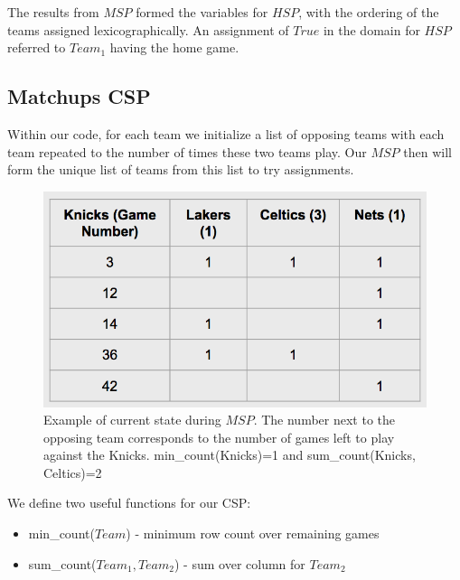 \documentclass{article}
\begin{document}
	The results from $MSP$ formed the variables for $HSP$, with the ordering of the teams assigned lexicographically. An assignment of $True$ in the domain for $HSP$ referred to $Team_1$ having the home game. 

	\subsection{Matchups CSP}
	Within our code, for each team we initialize a list of opposing teams with each team repeated to the number of times these two teams play. Our $MSP$ then will form the unique list of teams from this list to try assignments. 

	\begin{figure}
	\caption{Example of current state during $MSP$. The number next to the opposing team corresponds to the number of games left to play against the Knicks.
	min\_count(Knicks)=1 and sum\_count(Knicks, Celtics)=2}
	\includegraphics[scale=0.6]{matchups_game_counts}
	\end{figure}

	We define two useful functions for our CSP:
	\begin{itemize}
		\item min\_count($Team$) - minimum row count over remaining games
		\item sum\_count($Team_1, Team_2$) - sum over column for $Team_2$
	\end{itemize}
\end{document}
